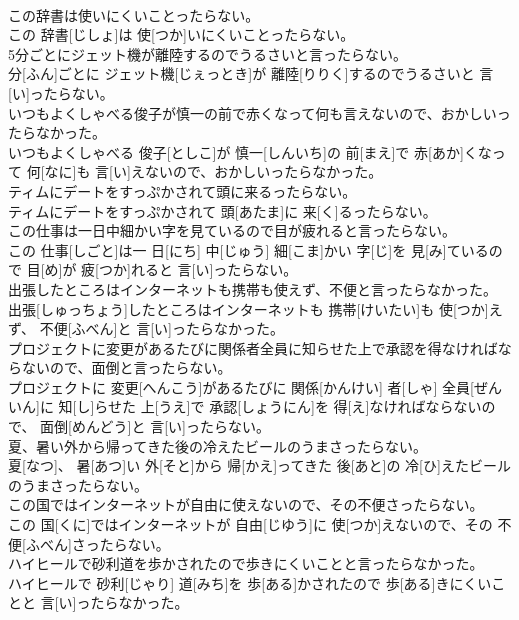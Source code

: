 \documentclass[8pt]{extreport}
\begin{document}
\begin{CJK}{UTF8}{min}
\\	この辞書は使いにくいことったらない。	
\\	この 辞書[じしょ]は 使[つか]いにくいことったらない。
\\	5分ごとにジェット機が離陸するのでうるさいと言ったらない。	
\\	分[ふん]ごとに ジェット機[じぇっとき]が 離陸[りりく]するのでうるさいと 言[い]ったらない。
\\	いつもよくしゃべる俊子が慎一の前で赤くなって何も言えないので、おかしいったらなかった。	
\\	いつもよくしゃべる 俊子[としこ]が 慎一[しんいち]の 前[まえ]で 赤[あか]くなって 何[なに]も 言[い]えないので、おかしいったらなかった。
\\	ティムにデートをすっぷかされて頭に来るったらない。	
\\	ティムにデートをすっぷかされて 頭[あたま]に 来[く]るったらない。
\\	この仕事は一日中細かい字を見ているので目が疲れると言ったらない。	
\\	この 仕事[しごと]は一 日[にち] 中[じゅう] 細[こま]かい 字[じ]を 見[み]ているので 目[め]が 疲[つか]れると 言[い]ったらない。
\\	出張したところはインターネットも携帯も使えず、不便と言ったらなかった。	
\\	出張[しゅっちょう]したところはインターネットも 携帯[けいたい]も 使[つか]えず、 不便[ふべん]と 言[い]ったらなかった。
\\	プロジェクトに変更があるたびに関係者全員に知らせた上で承認を得なければならないので、面倒と言ったらない。	
\\	プロジェクトに 変更[へんこう]があるたびに 関係[かんけい] 者[しゃ] 全員[ぜんいん]に 知[し]らせた 上[うえ]で 承認[しょうにん]を 得[え]なければならないので、 面倒[めんどう]と 言[い]ったらない。
\\	夏、暑い外から帰ってきた後の冷えたビールのうまさったらない。	
\\	夏[なつ]、 暑[あつ]い 外[そと]から 帰[かえ]ってきた 後[あと]の 冷[ひ]えたビールのうまさったらない。
\\	この国ではインターネットが自由に使えないので、その不便さったらない。	
\\	この 国[くに]ではインターネットが 自由[じゆう]に 使[つか]えないので、その 不便[ふべん]さったらない。
\\	ハイヒールで砂利道を歩かされたので歩きにくいことと言ったらなかった。	
\\	ハイヒールで 砂利[じゃり] 道[みち]を 歩[ある]かされたので 歩[ある]きにくいことと 言[い]ったらなかった。

\end{CJK}
\end{document}
